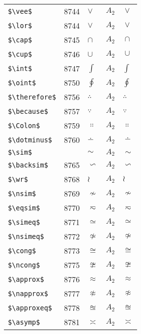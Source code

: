 \documentclass{article}
\begin{document}
\begin{table}
\begin{center}
\begin{tabular}{llll}
 \verb#$\vee$#            & 8744    & $\vee$            & $A_2\quad \vee$\\
 \verb#$\lor$#            & 8744    & $\lor$            & $A_2\quad \lor$\\
 \verb#$\cap$#            & 8745    & $\cap$            & $A_2\quad \cap$\\
 \verb#$\cup$#            & 8746    & $\cup$            & $A_2\quad \cup$\\
 \verb#$\int$#            & 8747    & $\int$            & $A_2\quad \int$\\
 \verb#$\oint$#           & 8750    & $\oint$           & $A_2\quad \oint$\\
 \verb#$\therefore$#      & 8756    & $\therefore$      & $A_2\quad \therefore$\\
 \verb#$\because$#        & 8757    & $\because$        & $A_2\quad \because$\\
 \verb#$\Colon$#          & 8759    & $\Colon$          & $A_2\quad \Colon$\\
 \verb#$\dotminus$#       & 8760    & $\dotminus$       & $A_2\quad \dotminus$\\
 \verb#$\sim$#            &         & $\sim$            & $A_2\quad \sim$\\
 \verb#$\backsim$#        & 8765    & $\backsim$        & $A_2\quad \backsim$\\
 \verb#$\wr$#             & 8768    & $\wr$             & $A_2\quad \wr$\\
 \verb#$\nsim$#           & 8769    & $\nsim$           & $A_2\quad \nsim$\\
 \verb#$\eqsim$#          & 8770    & $\eqsim$          & $A_2\quad \eqsim$\\
 \verb#$\simeq$#          & 8771    & $\simeq$          & $A_2\quad \simeq$\\
 \verb#$\nsimeq$#         & 8772    & $\nsimeq$         & $A_2\quad \nsimeq$\\
 \verb#$\cong$#           & 8773    & $\cong$           & $A_2\quad \cong$\\
 \verb#$\ncong$#          & 8775    & $\ncong$          & $A_2\quad \ncong$\\
 \verb#$\approx$#         & 8776    & $\approx$         & $A_2\quad \approx$\\
 \verb#$\napprox$#        & 8777    & $\napprox$        & $A_2\quad \napprox$\\
 \verb#$\approxeq$#       & 8778    & $\approxeq$       & $A_2\quad \approxeq$\\
 \verb#$\asymp$#          & 8781    & $\asymp$          & $A_2\quad \asymp$\\

\end{tabular}
\end{center}
\end{table}
\end{document}
